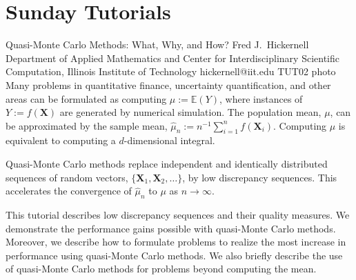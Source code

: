 \chapter{Sunday Tutorials}


\begin{talk}
 {Quasi-Monte Carlo Methods:  What, Why, and How?}%
 {Fred J.~Hickernell}%
 {Department of Applied Mathematics and Center for Interdisciplinary Scientific Computation, Illinois Institute of Technology}%
 {hickernell@iit.edu}%
 {}%
 {}%
 {}%
 {TUT02}%
 {photo}%
Many problems in  quantitative finance, uncertainty quantification, and other areas can be formulated as computing $\mu := \mathbb{E}(Y)$, where instances of $Y:=f(\boldsymbol{X})$ are generated by numerical simulation. The population mean, $\mu$, can be approximated by the sample mean, $\hat{\mu}_n := n^{-1} \sum_{i=1}^n f(\boldsymbol{X}_i)$.  Computing $\mu$ is equivalent to computing a $d$-dimensional integral.

Quasi-Monte Carlo methods replace independent and identically distributed  sequences of random vectors, $\{\boldsymbol{X}_1, \boldsymbol{X}_2, \ldots \}$, by low discrepancy sequences.  This accelerates the convergence of $\hat{\mu}_n$ to $\mu$ as $n \to \infty$. 


This tutorial describes  low discrepancy sequences  and their quality measures.  We demonstrate the performance gains possible with quasi-Monte Carlo methods.  Moreover, we describe how to formulate problems to realize the most increase in performance using quasi-Monte Carlo methods.  We also briefly describe the use of quasi-Monte Carlo methods for problems beyond computing the mean.

\end{talk}

\clearpage



